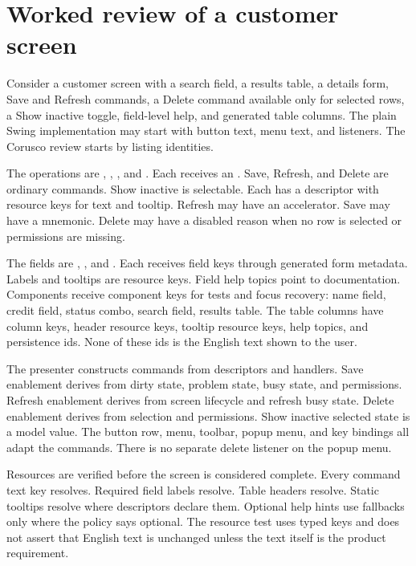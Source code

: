 \section{Worked review of a customer screen}

Consider a customer screen with a search field, a results table, a details
form, Save and Refresh commands, a Delete command available only for selected
rows, a Show inactive toggle, field-level help, and generated table columns.
The plain Swing implementation may start with button text, menu text, and
listeners. The Corusco review starts by listing identities.

The operations are , ,
, and . Each receives an
. Save, Refresh, and Delete are ordinary commands. Show inactive
is selectable. Each has a descriptor with resource keys for text and tooltip.
Refresh may have an accelerator. Save may have a mnemonic. Delete may have a
disabled reason when no row is selected or permissions are missing.

The fields are , , and
. Each receives field keys through generated form
metadata. Labels and tooltips are resource keys. Field help topics point to
documentation. Components receive component keys for tests and focus recovery:
name field, credit field, status combo, search field, results table. The table
columns have column keys, header resource keys, tooltip resource keys, help
topics, and persistence ids. None of these ids is the English text shown to the
user.

The presenter constructs commands from descriptors and handlers. Save
enablement derives from dirty state, problem state, busy state, and permissions.
Refresh enablement derives from screen lifecycle and refresh busy state. Delete
enablement derives from selection and permissions. Show inactive selected
state is a model value. The button row, menu, toolbar, popup menu, and key
bindings all adapt the commands. There is no separate delete listener on the
popup menu.

Resources are verified before the screen is considered complete. Every command
text key resolves. Required field labels resolve. Table headers resolve. Static
tooltips resolve where descriptors declare them. Optional help hints use
fallbacks only where the policy says optional. The resource test uses typed
keys and does not assert that English text is unchanged unless the text itself
is the product requirement.

